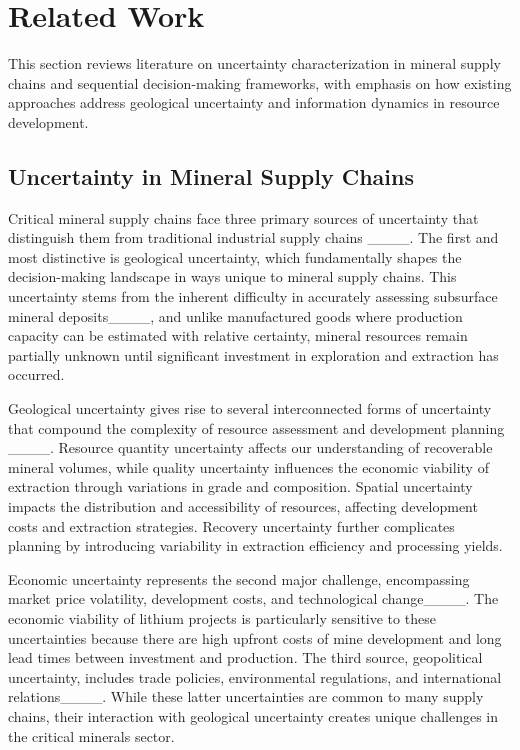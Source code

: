 \section{Related Work}
\label{sec:literature_review}

This section reviews literature on uncertainty characterization in mineral supply chains and sequential decision-making frameworks, with emphasis on how existing approaches address geological uncertainty and information dynamics in resource development.

\subsection{Uncertainty in Mineral Supply Chains}

Critical mineral supply chains face three primary sources of uncertainty that distinguish them from traditional industrial supply chains ____. The first and most distinctive is geological uncertainty, which fundamentally shapes the decision-making landscape in ways unique to mineral supply chains. This uncertainty stems from the inherent difficulty in accurately assessing subsurface mineral deposits____, and unlike manufactured goods where production capacity can be estimated with relative certainty, mineral resources remain partially unknown until significant investment in exploration and extraction has occurred.

Geological uncertainty gives rise to several interconnected forms of uncertainty that compound the complexity of resource assessment and development planning ____. Resource quantity uncertainty affects our understanding of recoverable mineral volumes, while quality uncertainty influences the economic viability of extraction through variations in grade and composition. Spatial uncertainty impacts the distribution and accessibility of resources, affecting development costs and extraction strategies. Recovery uncertainty further complicates planning by introducing variability in extraction efficiency and processing yields.

Economic uncertainty represents the second major challenge, encompassing market price volatility, development costs, and technological change____. The economic viability of lithium projects is particularly sensitive to these uncertainties because there are high upfront costs of mine development and long lead times between investment and production. The third source, geopolitical uncertainty, includes trade policies, environmental regulations, and international relations____. While these latter uncertainties are common to many supply chains, their interaction with geological uncertainty creates unique challenges in the critical minerals sector.

